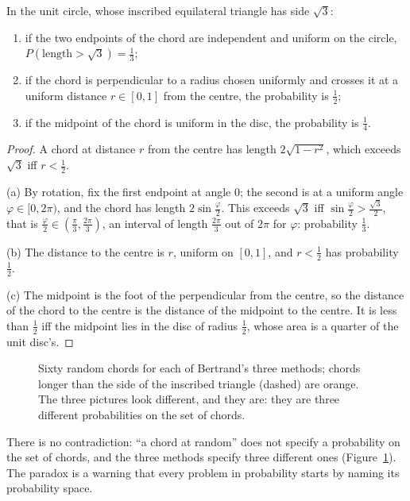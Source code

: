 \begin{proposition}\label{prop:bertrand}
In the unit circle, whose inscribed equilateral triangle has side $\sqrt3$:
\begin{enumerate}[label=(\alph*)]
\item if the two endpoints of the chord are independent and uniform on the circle, $P(\text{length}>\sqrt3)=\frac13$;
\item if the chord is perpendicular to a radius chosen uniformly and crosses it at a uniform distance $r\in[0,1]$
from the centre, the probability is $\frac12$;
\item if the midpoint of the chord is uniform in the disc, the probability is $\frac14$.
\end{enumerate}
\end{proposition}
\begin{proof}
A chord at distance $r$ from the centre has length $2\sqrt{1-r^2}$, which exceeds $\sqrt3$ iff $r<\frac12$.

(a) By rotation, fix the first endpoint at angle $0$; the second is at a uniform angle $\varphi\in[0,2\pi)$, and
the chord has length $2\sin\frac\varphi2$. This exceeds $\sqrt3$ iff $\sin\frac\varphi2>\frac{\sqrt3}2$, that is
$\frac\varphi2\in(\frac\pi3,\frac{2\pi}3)$, an interval of length $\frac{2\pi}3$ out of $2\pi$ for $\varphi$:
probability $\frac13$.

(b) The distance to the centre is $r$, uniform on $[0,1]$, and $r<\frac12$ has probability $\frac12$.

(c) The midpoint is the foot of the perpendicular from the centre, so the distance of the chord to the centre
is the distance of the midpoint to the centre. It is less than $\frac12$ iff the midpoint lies in the disc of
radius $\frac12$, whose area is a quarter of the unit disc's.
\end{proof}

\begin{figure}[ht]
\centering
{}
\caption{Sixty random chords for each of Bertrand's three methods; chords longer than the side of the inscribed
triangle (dashed) are orange. The three pictures look different, and they are: they are three different
probabilities on the set of chords.}
\label{fig:bertrand}
\end{figure}

There is no contradiction: ``a chord at random'' does not specify a probability on the set of chords, and the
three methods specify three different ones (Figure~\ref{fig:bertrand}). The paradox is a warning that every
problem in probability starts by naming its probability space.

